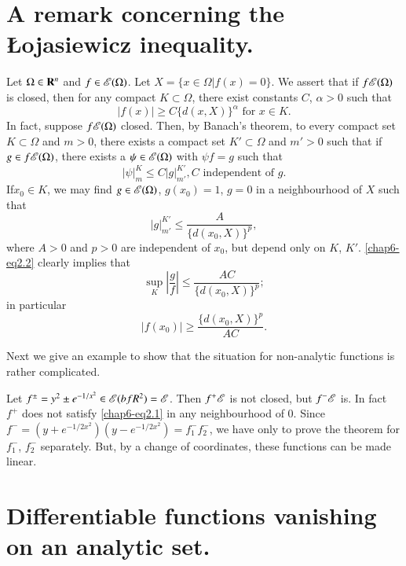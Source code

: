 \section[A remark concerning the {\L}ojasiewicz inequality]{A remark concerning the {\L}ojasiewicz inequality.}\label{chap6-sec2}

Let $\Omega\in \mathbf{R}^{n}$ and $f\in \mathscr{E}(\Omega)$. Let $X=\{x\in \Omega|f(x)=0\}$. We assert that if $f\mathscr{E}(\Omega)$ is closed, then for any compact $K\subset \Omega$, there exist constants $C$, $\alpha>0$ such that
\setcounter{equation}{0}
\begin{equation}
|f(x)|\geq C\{d(x,X)\}^{\alpha}\text{ for } x\in K.\label{chap6-eq2.1}
\end{equation}
In fact, suppose $f\mathscr{E}(\Omega)$ closed. Then, by Banach's theorem, to every compact set $K\subset \Omega$ and $m>0$, there exists a compact set $K'\subset \Omega$ and $m'>0$ such that if $g\in f\mathscr{E}(\Omega)$, there exists a $\psi\in \mathscr{E}(\Omega)$ with $\psi f=g$ such that
\begin{equation}
|\psi|^{K}_{m}\leq C|g|^{K'}_{m'}, C\text{ independent of } g.\label{chap6-eq2.2}
\end{equation}
If\pageoriginale $x_{0}\in K$, we may find $g\in\mathscr{E}(\Omega)$, $g(x_{0})=1$, $g=0$ in a neighbourhood of $X$ such that
$$
|g|^{K'}_{m'}\leq \dfrac{A}{\{d(x_{0},X)\}^{p}},
$$
where $A>0$ and $p>0$ are independent of $x_{0}$, but depend only on $K$, $K'$. \eqref{chap6-eq2.2} clearly implies that
$$
\sup\limits_{K}\left|\dfrac{g}{f}\right|\leq \dfrac{AC}{\{d(x_{0},X)\}^{p}};
$$
in particular
$$
|f(x_{0})|\geq \dfrac{\{d(x_{0},X)\}^{p}}{AC}.
$$

Next we give an example to show that the situation for non-analytic functions is rather complicated.

Let $f^{\pm}=y^{2}\pm e^{-1/x^{2}}\in \mathscr{E}(bfR^{2})=\mathscr{E}$. Then $f^{+}\mathscr{E}$ is not closed, but $f^{-}\mathscr{E}$ is. In fact $f^{+}$ does not satisfy \eqref{chap6-eq2.1} in any neighbourhood of $0$. Since $f^{-}=(y+e^{-1/2x^{2}})(y-e^{-1/2x^{2}})=f^{-}_{1}f^{-}_{2}$, we have only to prove the theorem for $f^{-}_{1}$, $f^{-}_{2}$ separately. But, by a change of coordinates, these functions can be made linear.

\section[Differentiable functions vanishing on an analytic set]{Differentiable functions vanishing on an analytic set.}\label{chap6-sec3}

